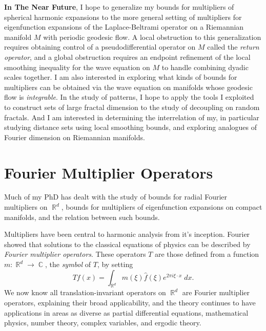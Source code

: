 \documentclass[12pt]{article}
\DeclareMathOperator{\RR}{\mathbb{R}}
\DeclareMathOperator{\CC}{\mathbb{C}}
\begin{document}
{\bf In The Near Future}, I hope to generalize my bounds for multipliers of spherical harmonic expansions to the more general setting of multipliers for eigenfunction expansions of the Laplace-Beltrami operator on a Riemannian manifold $M$ with periodic geodesic flow. A local obstruction to this generalization requires obtaining control of a pseudodifferential operator on $M$ called the \emph{return operator}, and a global obstruction requires an endpoint refinement of the local smoothing inequality for the wave equation on $M$ to handle combining dyadic scales together. I am also interested in exploring what kinds of bounds for multipliers can be obtained via the wave equation on manifolds whose geodesic flow is \emph{integrable}. In the study of patterns, I hope to apply the tools I exploited to construct sets of large fractal dimension to the study of decoupling on random fractals. And I am interested in determining the interrelation of my, in particular studying distance sets using local smoothing bounds, and exploring analogues of Fourier dimension on Riemannian manifolds.

\pagebreak[3]






\section*{Fourier Multiplier Operators}

Much of my PhD has dealt with the study of bounds for radial Fourier multipliers on $\RR^d$, bounds for multipliers of eigenfunction expansions on compact manifolds, and the relation between such bounds.

Multipliers have been central to harmonic analysis from it's inception. Fourier showed that solutions to the classical equations of physics can be described by \emph{Fourier multiplier operators}. These operators $T$ are those defined from a function $m: \RR^d \to \CC$, the \emph{symbol} of $T$, by setting
%
\[ Tf(x) = \int_{\RR^d} m(\xi) \widehat{f}(\xi) e^{2 \pi i \xi \cdot x}\; dx. \]
%
We now know all translation-invariant operators on $\RR^d$ are Fourier multiplier operators, explaining their broad applicability, and the theory continues to have applications in areas as diverse as partial differential equations, mathematical physics, number theory, complex variables, and ergodic theory.
\end{document}
